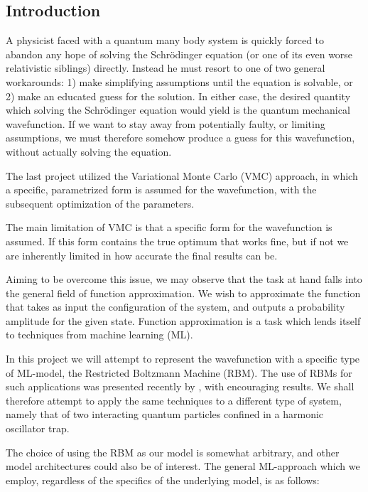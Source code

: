 \documentclass[a4paper, 11pt]{article}
\begin{document}
\begin{multicols}{2}    

    \section{Introduction} 

    A physicist faced with a quantum many body system is quickly forced to
    abandon any hope of solving the Schrödinger equation (or one of its even worse
    relativistic siblings) directly. Instead he must resort to one of two general
    workarounds: 1) make simplifying assumptions until the equation is solvable,
    or 2) make an educated guess for the solution. In either case, the desired
    quantity which solving the Schrödinger equation would yield is the quantum
    mechanical wavefunction. If we want to stay away from potentially faulty, or
    limiting assumptions, we must therefore somehow produce a guess for this
    wavefunction, without actually solving the equation.

    The last project utilized the Variational Monte Carlo (VMC) approach, in which a
    specific, parametrized form is assumed for the wavefunction, with the
    subsequent optimization of the parameters.

    The main limitation of VMC is that a specific form for the wavefunction is
    assumed. If this form contains the true optimum that works fine, but if not
    we are inherently limited in how accurate the final results can be.

    Aiming to be overcome this issue, we may observe that the task at hand falls
    into the general field of function approximation. We wish to approximate the
    function that takes as input the configuration of the system, and outputs a
    probability amplitude for the given state. Function approximation is a task
    which lends itself to techniques from machine learning (ML). 

    In this project we will attempt to represent the wavefunction with a
    specific type of ML-model, the Restricted Boltzmann Machine (RBM). The use
    of RBMs for such applications was presented recently by
    \textcite{Carleo602}, with encouraging results. We shall therefore attempt
    to apply the same techniques to a different type of system, namely that of
    two interacting quantum particles confined in a harmonic oscillator trap.

    The choice of using the RBM as our model is somewhat arbitrary, and other
    model architectures could also be of interest. The general ML-approach which
    we employ, regardless of the specifics of the underlying model, is as follows:


\end{multicols}
\end{document}
